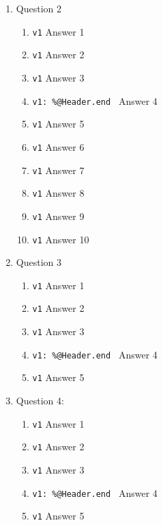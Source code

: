 \documentclass{article}%
\begin{document}
\begin{enumerate}
\item Question 2
\begin{enumerate}
	\item \verb+v1+ Answer 1
	\item \verb+v1+ Answer 2
	\item \verb+v1+ Answer 3
	\item \verb+v1: %@Header.end + Answer 4 %
	\item \verb+v1+ Answer 5
	\item \verb+v1+ Answer 6
	\item \verb+v1+ Answer 7
	\item \verb+v1+ Answer 8		%
	\item \verb+v1+ Answer 9
	\item \verb+v1+ Answer 10	
\end{enumerate}

\item Question 3
\begin{enumerate}
	\item \verb+v1+ Answer 1
	\item \verb+v1+ Answer 2
	\item \verb+v1+ Answer 3
	\item \verb+v1: %@Header.end + Answer 4 %
	\item \verb+v1+ Answer 5
\end{enumerate}

\item Question 4:
\begin{enumerate}
	\item \verb+v1+ Answer 1
	\item \verb+v1+ Answer 2
	\item \verb+v1+ Answer 3
	\item \verb+v1: %@Header.end + Answer 4 %
	\item \verb+v1+ Answer 5
\end{enumerate}


\end{enumerate}
\end{document}
